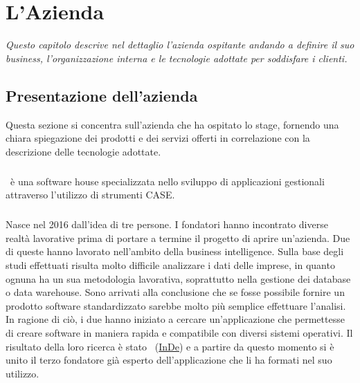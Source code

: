 

\chapter{L'Azienda}
\label{cap1:L'Azienda}
\textit{Questo capitolo descrive nel dettaglio l'azienda ospitante andando a definire il suo business, l’organizzazione interna e le tecnologie adottate per soddisfare i clienti.}

\section{Presentazione dell'azienda}
\label{cap1:Presentazione dell'azienda}
Questa sezione si concentra sull'azienda che ha ospitato lo stage, fornendo una chiara spiegazione dei prodotti e dei servizi offerti in correlazione con la descrizione delle tecnologie adottate.

\subsection{\azienda}
\label{cap1:Tepui}
\paragraph*{}\azienda\ è una software house specializzata nello sviluppo di applicazioni gestionali attraverso l'utilizzo di strumenti CASE. 

\paragraph*{}Nasce nel 2016 dall'idea di tre persone. I fondatori hanno incontrato diverse realtà lavorative prima di portare a termine il progetto di aprire un'azienda. Due di queste hanno lavorato nell'ambito della business intelligence. Sulla base degli studi effettuati risulta molto difficile analizzare i dati delle imprese, in quanto ognuna ha un sua metodologia lavorativa, soprattutto nella gestione dei database o data warehouse. Sono arrivati alla conclusione che se fosse possibile fornire un prodotto software standardizzato sarebbe molto più semplice effettuare l'analisi. In ragione di ciò, i due hanno iniziato a cercare un'applicazione che permettesse di creare software in maniera rapida e compatibile con diversi sistemi operativi. Il risultato della loro ricerca è stato \inde\ (\hyperref[InDe]{InDe}) e a partire da questo momento si è unito il terzo fondatore già esperto dell'applicazione che li ha formati nel suo utilizzo.

